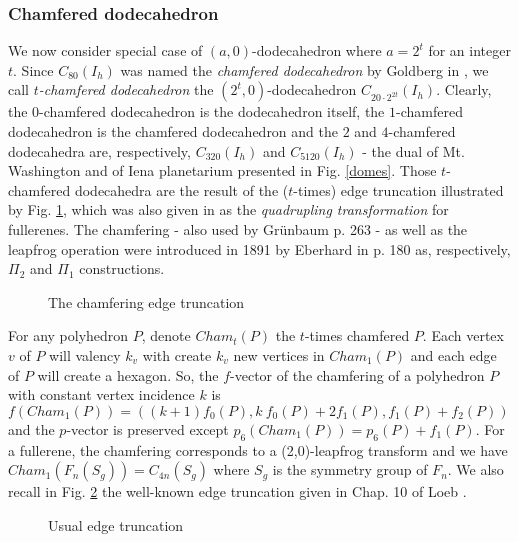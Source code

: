 \subsubsection{Chamfered dodecahedron}\label{CCC}
We now consider special case of $(a,0)$-dodecahedron where $a=2^t$ for an 
integer $t$. Since $C_{80}(I_h)$ was named the {\it chamfered dodecahedron} by 
{\sc Goldberg} in \cite{g35}, we call {\it $t$-chamfered dodecahedron} the 
$(2^t,0)$-dodecahedron $C_{20\cdot2^{2t}}(I_h)$. Clearly, the $0$-chamfered 
dodecahedron is the dodecahedron itself, the $1$-chamfered dodecahedron
is the chamfered dodecahedron and the $2$ and $4$-chamfered dodecahedra 
are, respectively, $C_{320}(I_h)$ and $C_{5120}(I_h)$ - the dual of Mt. Washington 
and of Iena planetarium presented in Fig. \ref{domes}.  
Those $t$-chamfered dodecahedra are the result
of the ($t$-times) edge truncation illustrated by Fig. \ref{chamfering}, which was
also given in
\cite{fow87} as the {\it quadrupling transformation} for fullerenes.
The chamfering - also used by {\sc Gr\"unbaum} \cite{grun} p. 263 -
as well as the leapfrog operation were introduced in 1891 by  {\sc Eberhard} in \cite{eber91} 
p. 180 as, respectively, $\Pi_2$ and $\Pi_1$ constructions. 

\begin{figure}[hbtp]
\begin{center}
\caption{The chamfering edge truncation}\label{chamfering}
\end{center}
\end{figure}

\clearpage
\newpage
For any polyhedron $P$, denote $Cham_t(P)$ the $t$-times chamfered $P$.
Each vertex $v$ of $P$ will valency $k_v$ with create $k_v$ new vertices in $Cham_1(P)$
and each edge of $P$ will create a hexagon. So, the $f$-vector of the chamfering
of a polyhedron $P$ with 
constant vertex incidence $k$ is $f(Cham_1(P))=((k+1)f_0(P),k\:f_0(P)+2 f_1(P), f_1(P) + f_2(P))$
and the $p$-vector is preserved except $p_6(Cham_1(P))=p_6(P)+f_1(P)$.
For a fullerene, the chamfering corresponds to a (2,0)-leapfrog transform and 
we have $Cham_1(F_n(S_g))=C_{4n}(S_g)$
where $S_g$ is the symmetry group of $F_n$.
We also recall in Fig. \ref{loeb} the well-known edge truncation
given in Chap. 10 of {\sc Loeb} \cite{loeb}.
 
\begin{figure}[htbp]
\begin{center}
\caption{Usual edge truncation}\label{loeb}
\end{center}
\end{figure}

